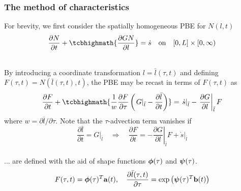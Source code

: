 \documentclass[10pt,xcolor=dvipsnames]{beamer}
\begin{document}

\begin{frame}[t]

  \frametitle{The method of characteristics}


  For brevity, we first consider the spatially homogeneous PBE for $N(l, t)$
  \begin{equation*}
    \frac{\partial N}{\partial t} + \tcbhighmath{\frac{\partial G N}{\partial l}} = \dot{s} \quad\text{on}\quad [0, L] \times [0, \infty)
  \end{equation*}

  \\
  \justifying By introducing a coordinate transformation $l = \bar{l}(\tau, t)$ and defining $F(\tau, t) = N(\bar{l}(\tau, t), t)$, the PBE may be recast in terms of $F(\tau, t)$ as
  \begin{equation*}
  \begin{split}
    \frac{\partial F}{\partial t}
    + \tcbhighmath{\frac{1}{w} \frac{\partial F}{\partial\tau}
    \left(\left.G\right|_{\bar{l}} - \frac{\partial\bar{l}}{\partial t}\right)}
    = \left.\dot{s}\right|_{\bar{l}} - \left.\frac{\partial G}{\partial l}\right|_{\bar{l}} F
  \label{eq:pbe:F}
  \end{split}
  \end{equation*}
  where $w = \partial\bar{l}/\partial\tau$. Note that the $\tau$-advection term vanishes if
  \begin{equation*}
    \frac{\partial\bar{l}}{\partial t} = \left.G\right|_{\bar{l}} \quad\Rightarrow\quad \frac{\partial F}{\partial t} =
    -\left.\frac{\partial G}{\partial l}\right|_{\bar{l}} F + \left.\dot{s}\right|_{\bar{l}}
  \label{eq:pbepod}
  \end{equation*}
  \justifying{}\\
  ... are defined with the aid of shape functions ${\boldsymbol \phi}(\tau)$ and ${\boldsymbol \psi}(\tau)$.
  \begin{equation*}
    F(\tau, t) = {\boldsymbol \phi}(\tau)^T {\mathbf a}(t), \quad
    \frac{\partial\bar{l}(\tau, t)}{\partial\tau} = \exp\left({\boldsymbol \psi}(\tau)^T{\mathbf b}(t)\right)
  \label{eq:discrete}
  \end{equation*}

\end{frame}
\end{document}

